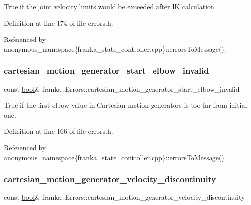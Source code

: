 True if the joint velocity limits would be exceeded after IK calculation. 

Definition at line 174 of file errors.\+h.



Referenced by anonymous\+\_\+namespace\{franka\+\_\+state\+\_\+controller.\+cpp\}\+::errors\+To\+Message().

\mbox{\label{structfranka_1_1Errors_a6d905b803bbe8a7be8490f2a94ba524a}} 
\subsubsection{\texorpdfstring{cartesian\+\_\+motion\+\_\+generator\+\_\+start\+\_\+elbow\+\_\+invalid}{cartesian\_motion\_generator\_start\_elbow\_invalid}}
{\footnotesize\ttfamily const \hyperlink{classbool}{bool}\& franka\+::\+Errors\+::cartesian\+\_\+motion\+\_\+generator\+\_\+start\+\_\+elbow\+\_\+invalid}

True if the first elbow value in Cartesian motion generators is too far from initial one. 

Definition at line 166 of file errors.\+h.



Referenced by anonymous\+\_\+namespace\{franka\+\_\+state\+\_\+controller.\+cpp\}\+::errors\+To\+Message().

\mbox{\label{structfranka_1_1Errors_a17e4a9b6b7dc4cc12c1328d36cac3eaf}} 
\subsubsection{\texorpdfstring{cartesian\+\_\+motion\+\_\+generator\+\_\+velocity\+\_\+discontinuity}{cartesian\_motion\_generator\_velocity\_discontinuity}}
{\footnotesize\ttfamily const \hyperlink{classbool}{bool}\& franka\+::\+Errors\+::cartesian\+\_\+motion\+\_\+generator\+\_\+velocity\+\_\+discontinuity}

